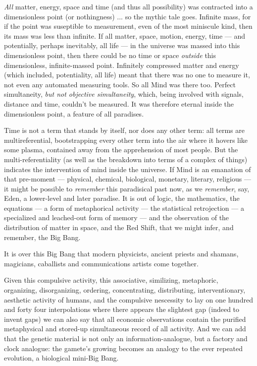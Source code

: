 \documentclass[11pt,twoside,draft]{memoir}
\begin{document}
\emph{All} matter, energy, space and time (and
thus all possibility) was contracted into a
dimensionless point (or nothingness) ... so
the mythic tale goes. Infinite mass, for if the
point was suseptible to measurement,
even of the most miniscule kind, then its mass
was less than infinite. If all matter, space,
motion, energy, time --- and potentially, perhaps inevitably, all life --- in the universe was
massed into this dimensionless point, then
there could be no time or space \emph{outside} this
dimensionless, infinite-massed point. Infinitely compressed matter and energy (which
included, potentiality, all life) meant that
there was no one to measure it, not even any
automated measuring tools. So all Mind was
there too. Perfect simultaneity, \emph{but not objective simultaneity}, which, being involved
with signals, distance and time, couldn't be
measured. It was therefore eternal inside the
dimensionless point, a feature of all paradises.

Time is not a term that stands by itself, nor
does any other term: all terms are multireferential, bootstrapping every other term
into the air where it hovers like some plasma, contained away from the apprehension
of most people. But the multi-referentiality
(as well as the breakdown into terms of a
complex of things) indicates the intervention of mind inside the universe. If Mind is
an emanation of that pre-moment --- physical, chemical, biological, monetary, literary,
religious --- it might be possible to \emph{remember}
this paradisical past now, as we \emph{remember},
say, Eden, a lower-level and later paradise. It
is out of logic, the mathematics, the equations --- a form of metaphorical activity --- the
statistical retrojection --- a specialized and
leached-out form of memory --- and the observation of the distribution of matter in space,
and the Red Shift, that we might infer, and remember, the Big Bang.

It is over this Big Bang that modern physicists, ancient priests and shamans, magicians, caballists and communications artists come together.

Given this compulsive activity, this associative, similizing, metaphoric, organizing, disorganizing, ordering, concentrating,
distributing, interventionary, aesthetic activity of humans, and the compulsive nescessity
to lay on one hundred and forty four interpolations where there appears the slightest gap
(indeed to invent gaps) we can also say that
all economic observations contain the purified metaphysical and stored-up simultaneous record of all activity. And we can add
that the genetic material is not only an
information-analogue, but a factory and
clock analogue: the gamete's growing becomes an analogy to the ever repeated evolution, a biological mini-Big Bang.
\end{document}
